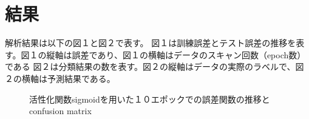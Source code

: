 \documentclass{jarticle}
\begin{document}
\section{結果}
解析結果は以下の図１と図２で表す。
図１は訓練誤差とテスト誤差の推移を表す。図１の縦軸は誤差であり、図１の横軸はデータのスキャン回数（epoch数）である
図２は分類結果の数を表す。図２の縦軸はデータの実際のラベルで、図２の横軸は予測結果である。
\begin{figure}[h]
\centering
{}%
\qquad
{}%
\caption{活性化関数sigmoidを用いた１０エポックでの誤差関数の推移とconfusion matrix}%
\label{fig:example}%
\end{figure}

\end{document}
